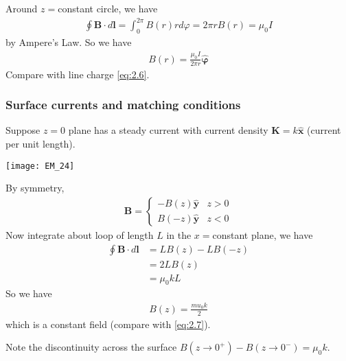 \documentclass[a4paper]{article}
\begin{document}
Around $z=$constant circle, we have
\begin{equation*}
\begin{aligned}
\oint \mathbf{B} \cdot d\mathbf{l} = \int_0^{2\pi} B(r) rd\varphi = 2\pi r B(r) = \mu_0 I
\end{aligned}
\end{equation*}
by Ampere's Law. So we have
\begin{equation*}\tag{3.5} \label{eq:3.5}
\begin{aligned}
B(r) = \frac{\mu_0 I}{2\pi r} \hat{\mathbf{\varphi}}
\end{aligned}
\end{equation*}
Compare with line charge \eqref{eq:2.6}.

\subsubsection{Surface currents and matching conditions}
Suppose $z=0$ plane has a steady current with current density $\mathbf{K} = k\hat{\mathbf{x}}$ (current per unit length).

\texttt{[image: EM\_24]}

By symmetry,
\begin{equation*}
\begin{aligned}
\mathbf{B} = \left\{\begin{array}{ll}
-B(z) \hat{\mathbf{y}} & z>0\\
B(-z) \hat{\mathbf{y}} & z<0
\end{array}\right.
\end{aligned}
\end{equation*}
Now integrate about loop of length $L$ in the $x=$constant plane, we have
\begin{equation*}
\begin{aligned}
\oint \mathbf{B} \cdot d\mathbf{l} &= LB(z) - LB(-z)\\
&= 2LB(z)\\
&= \mu_0 kL
\end{aligned}
\end{equation*}
So we have
\begin{equation*} \tag{3.6} \label{eq:3.6}
\begin{aligned}
B(z) = \frac{mu_0 k}{2}
\end{aligned}
\end{equation*}
which is a constant field (compare with \eqref{eq:2.7}).

Note the discontinuity across the surface $B(z \to 0^+) - B(z \to 0^-) = \mu_0 k$.
\end{document}
